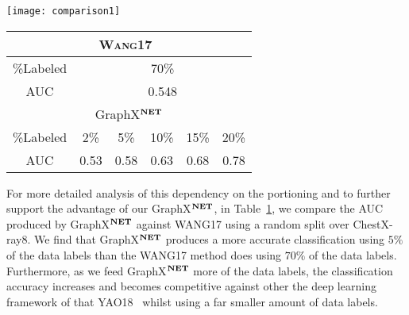 \documentclass[runningheads]{llncs}
\begin{document}
\begin{table}[t!]
	\begin{minipage}{0.59\linewidth}
		\centering
		\texttt{[image: comparison1]}
\label{}
	\end{minipage}
		\begin{minipage}{0.40\linewidth}
		\label{table:student}
		\centering
		\begin{tabular}{|c|c|c|c|c|c|}
            \hline
            \multicolumn{6}{|c|}{\cellcolor[HTML]{EFEFEF}\textsc{Wang17}~\cite{wang2017chestx}} \\ \hline
            \%Labeled             & \multicolumn{5}{c|}{70\%}                  \\ \hline
            AUC           & \multicolumn{5}{c|}{0.548}                \\ \hline \hline
            \multicolumn{6}{|c|}{\cellcolor[HTML]{EFEFEF}GraphX$^{\textbf{\scriptsize NET}}$}   \\ \hline
            \%Labeled              & 2\%   &  5\%      & 10\%   &  15\%     &   20\%     \\ \hline
            AUC     & 0.53     & 0.58     & 0.63     & 0.68    & 0.78    \\ \hline
        \end{tabular}
	\end{minipage}
\end{table}

For more detailed analysis of this dependency on the portioning and to further support the advantage of our GraphX$^{\textbf{\scriptsize NET}}$, in Table~\ref{table:student}, we compare the AUC produced by GraphX$^{\textbf{\scriptsize NET}}$ against WANG17 using a random split over ChestX-ray8. We find that GraphX$^{\textbf{\scriptsize NET}}$ produces a more accurate classification using $5\%$ of the data labels than the WANG17 method does using $70\%$ of the data labels. Furthermore, as we feed GraphX$^{\textbf{\scriptsize NET}}$ more of the data labels, the classification accuracy increases and becomes competitive against other the deep learning framework of that YAO18~\cite{yao2018weakly} whilst using a far smaller amount of data labels.
\end{document}
